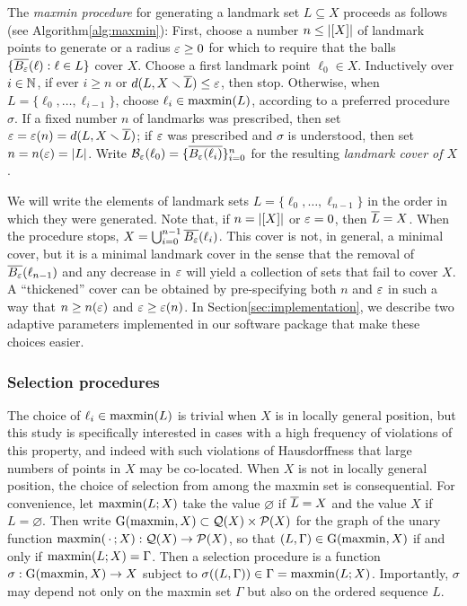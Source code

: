 \documentclass[
]{article}
\begin{document}
The \emph{maxmin procedure} for generating a landmark set
\(L\subseteq X\) proceeds as follows (see
Algorithm\nbs\ref{alg:maxmin}): First, choose a number \(n\leq\lvert [X]\rvert\)
of landmark points to generate or a radius \(\varepsilon\geq 0\) for which to
require that the balls \(\{ \overline{B_{\varepsilon}}(\ell) : \ell \in L \}\) cover
\(X\). Choose a first landmark point \(\ell_0\in X\). Inductively over
\(i\in\mathbb{N}\), if ever \(i\geq n\) or \(d(L,X\smallsetminus \overline{L})\leq\varepsilon\), then
stop. Otherwise, when \(L=\{\ell_0,\ldots,\ell_{i-1}\}\), choose
\(\ell_i\in\operatorname{maxmin}(L)\), according to a preferred procedure \(\sigma\).
If a fixed number \(n\) of landmarks was prescribed, then set
\(\varepsilon=\varepsilon(n)=d(L,X\smallsetminus \overline{L})\); if \(\varepsilon\) was prescribed and
\(\sigma\) is understood, then set \(n=n(\varepsilon)=\lvert L\rvert\). Write
\(\mathcal{B}_\varepsilon(\ell_0)=\{\overline{B_{\varepsilon}(\ell_i)}\}_{i=0}^{n}\) for the
resulting \emph{landmark cover of $X$}.

We will write the elements of landmark sets
\(L=\{\ell_0,\ldots,\ell_{n-1}\}\) in the order in which they were
generated. Note that, if \(n=\lvert [X]\rvert\) or \(\varepsilon=0\), then
\(\overline{L}=X\). When the procedure stops,
\(X=\bigcup_{i=0}^{n-1}{\overline{B_{\varepsilon}}(\ell_i)}\). This cover is not, in
general, a minimal cover, but it is a minimal landmark cover in the
sense that the removal of \(\overline{B_\varepsilon}(\ell_{n-1})\) and any decrease
in \(\varepsilon\) will yield a collection of sets that fail to cover \(X\). A
``thickened'' cover can be obtained by pre-specifying both \(n\) and
\(\varepsilon\) in such a way that \(n \geq n(\varepsilon)\) and
\(\varepsilon \geq \varepsilon(n)\). In Section\nbs\ref{sec:implementation}, we
describe two adaptive parameters implemented in our software package
that make these choices easier.

\hypertarget{selection-procedures}{%
\subsubsection{Selection procedures}\label{selection-procedures}}

The choice of \(\ell_i \in \operatorname{maxmin}(L)\) is trivial when \(X\) is in
locally general position, but this study is specifically interested in
cases with a high frequency of violations of this property, and indeed
with such violations of Hausdorffness that large numbers of points in
\(X\) may be co-located. When \(X\) is not in locally general position,
the choice of selection from among the maxmin set is consequential. For
convenience, let \(\operatorname{maxmin}(L;X)\) take the value \(\varnothing\) if
\(\overline{L}=X\) and the value \(X\) if \(L=\varnothing\). Then write
\(\operatorname{G}(\operatorname{maxmin}, X) \subset \mathcal{Q}(X) \times \mathcal{P}(X)\) for the graph
of the unary function \(\operatorname{maxmin}(\,\cdot\,;X): \mathcal{Q}(X) \to \mathcal{P}(X)\),
so that \((L,\Gamma) \in \operatorname{G}(\operatorname{maxmin}, X)\) if and only if
\(\operatorname{maxmin}(L;X) = \Gamma\). Then a selection procedure is a function
\(\sigma: \operatorname{G}(\operatorname{maxmin}, X) \to X\) subject to
\(\sigma((L,\Gamma)) \in \Gamma = \operatorname{maxmin}(L;X)\). Importantly,
\(\sigma\) may depend not only on the maxmin set \(\Gamma\) but also on
the ordered sequence \(L\).
\end{document}
